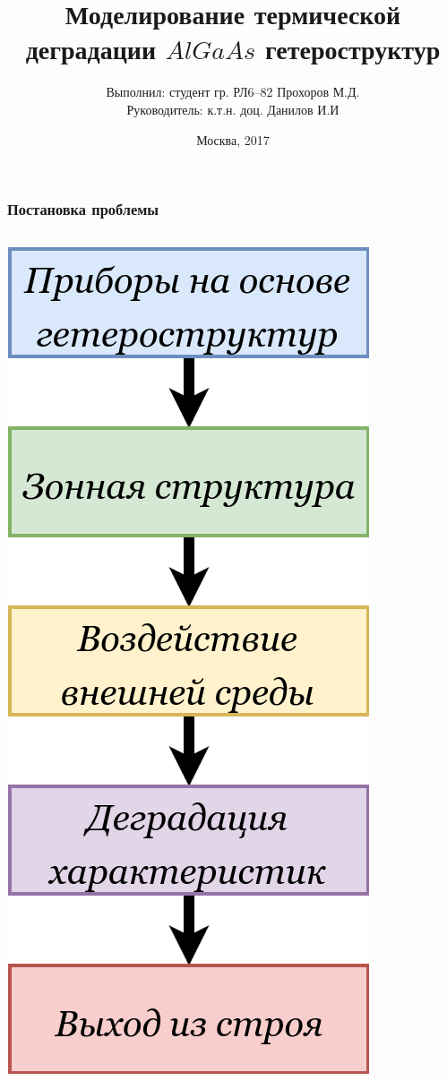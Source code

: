 \documentclass[10pt,pdf,hyperref={unicode},aspectratio={169}]{beamer}
\title{Моделирование термической деградации $AlGaAs$ гетероструктур}
\author[Прохоров М.Д.]{Выполнил: студент гр. РЛ6--82 Прохоров М.Д.\\ Руководитель: к.т.н. доц. Данилов И.И}
\date{Москва, 2017}
\institute[BMSTU]{МГТУ им. Н.Э.Баумана}
\begin{document}
\begin{frame}
	\titlepage
\end{frame} 

\begin{frame}
	\frametitle{Постановка проблемы}
	\begin{columns}
		\begin{center}
			\includegraphics[width=\textwidth]{assets/Trouble}

\end{center}
\end{columns}
\end{frame}
\end{document}
